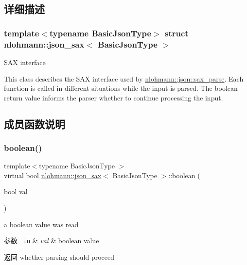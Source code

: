 \subsection{详细描述}
\subsubsection*{template$<$typename Basic\+Json\+Type$>$\newline
struct nlohmann\+::json\+\_\+sax$<$ Basic\+Json\+Type $>$}

S\+AX interface 

This class describes the S\+AX interface used by \mbox{\hyperlink{classnlohmann_1_1basic__json_a8a3dd150c2d1f0df3502d937de0871db}{nlohmann\+::json\+::sax\+\_\+parse}}. Each function is called in different situations while the input is parsed. The boolean return value informs the parser whether to continue processing the input. 

\subsection{成员函数说明}
\mbox{\label{structnlohmann_1_1json__sax_a82ed080814fa656191a537284bb0c575}} 
\subsubsection{\texorpdfstring{boolean()}{boolean()}}
{\footnotesize\ttfamily template$<$typename Basic\+Json\+Type $>$ \\
virtual bool \mbox{\hyperlink{structnlohmann_1_1json__sax}{nlohmann\+::json\+\_\+sax}}$<$ Basic\+Json\+Type $>$\+::boolean (\begin{DoxyParamCaption}\item[{bool}]{val }\end{DoxyParamCaption})\hspace{0.3cm}{\ttfamily [pure virtual]}}



a boolean value was read 


\begin{DoxyParams}[1]{参数}
\mbox{\texttt{ in}}  & {\em val} & boolean value \\
\hline
\end{DoxyParams}
\begin{DoxyReturn}{返回}
whether parsing should proceed 
\end{DoxyReturn}
\mbox{\label{structnlohmann_1_1json__sax_a235ee975617f28e6a996d1e36a282312}} 
